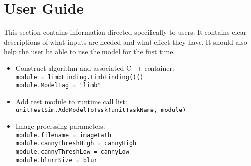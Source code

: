 
\section{User Guide}
This section contains information directed specifically to users. It contains clear descriptions of what inputs are needed and what effect they have. It should also help the user be able to use the model for the first time.

\begin{itemize}
\item Construct algorithm and associated C++ container:\\
\texttt{module = limbFinding.LimbFinding()()}\\
\texttt{module.ModelTag = "limb"}\\
\item Add test module to runtime call list: \\
\texttt{unitTestSim.AddModelToTask(unitTaskName, module)}\\
\item Image processing parameters: \\
\texttt{module.filename = imagePath}\\
\texttt{module.cannyThreshHigh = cannyHigh}\\
\texttt{module.cannyThreshLow = cannyLow}\\
\texttt{module.blurrSize = blur}\\
\end{itemize}